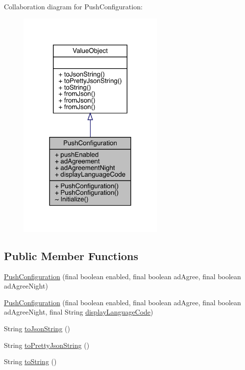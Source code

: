 Collaboration diagram for Push\+Configuration\+:
\nopagebreak
\begin{figure}[H]
\begin{center}
\leavevmode
\includegraphics[width=204pt]{classcom_1_1toast_1_1android_1_1gamebase_1_1base_1_1push_1_1_push_configuration__coll__graph}
\end{center}
\end{figure}
\subsection*{Public Member Functions}
\begin{DoxyCompactItemize}
\item 
\hyperlink{classcom_1_1toast_1_1android_1_1gamebase_1_1base_1_1push_1_1_push_configuration_a65c00660f0b5bee1e7384ec5c0d78a22}{Push\+Configuration} (final boolean enabled, final boolean ad\+Agree, final boolean ad\+Agree\+Night)
\item 
\hyperlink{classcom_1_1toast_1_1android_1_1gamebase_1_1base_1_1push_1_1_push_configuration_ac58c3be85937226c7a9d50352aedb8f0}{Push\+Configuration} (final boolean enabled, final boolean ad\+Agree, final boolean ad\+Agree\+Night, final String \hyperlink{classcom_1_1toast_1_1android_1_1gamebase_1_1base_1_1push_1_1_push_configuration_a4275e397239a0159905fcc9673788246}{display\+Language\+Code})
\item 
String \hyperlink{classcom_1_1toast_1_1android_1_1gamebase_1_1base_1_1_value_object_a58acf6402880e9769d79d8667581fa6a}{to\+Json\+String} ()
\item 
String \hyperlink{classcom_1_1toast_1_1android_1_1gamebase_1_1base_1_1_value_object_a054431f3d988a22295cfc8b784ff2637}{to\+Pretty\+Json\+String} ()
\item 
String \hyperlink{classcom_1_1toast_1_1android_1_1gamebase_1_1base_1_1_value_object_ad146fa8579a5f8a876c4688cc5a68520}{to\+String} ()
\end{DoxyCompactItemize}
